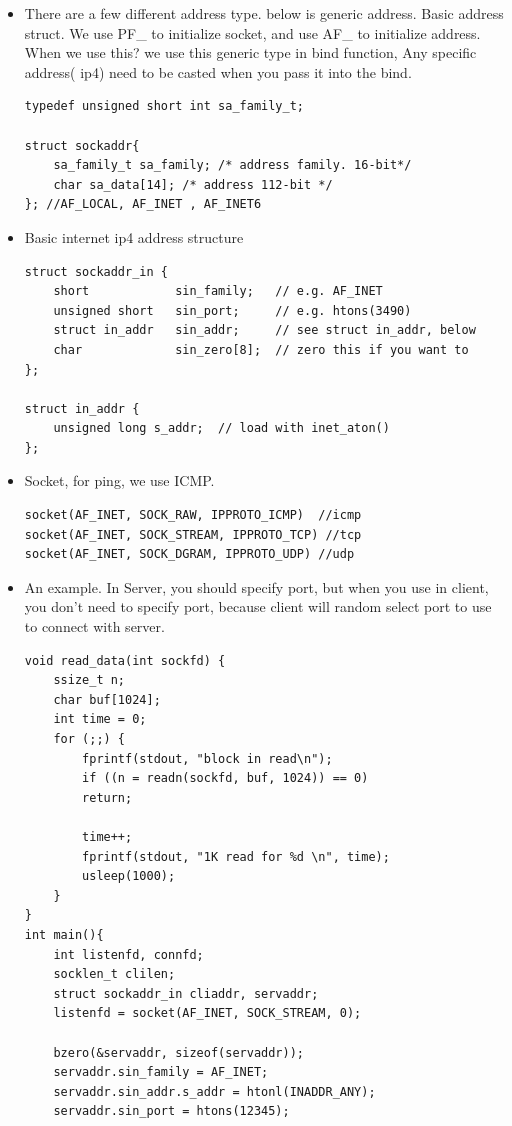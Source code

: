 \documentclass[a4paper,11pt,twoside]{book}
\begin{document}
\begin{itemize}
	\item There are a few different address type. below is generic address. Basic address struct. We use PF\_ to initialize socket, and use AF\_ to initialize  address. When we use this? we use this generic type in bind function, Any specific address( ip4) need to be casted when you pass it into the bind.  
\begin{lstlisting}
typedef unsigned short int sa_family_t;

struct sockaddr{
	sa_family_t sa_family; /* address family. 16-bit*/
	char sa_data[14]; /* address 112-bit */
}; //AF_LOCAL, AF_INET , AF_INET6	
\end{lstlisting}	
	
	\item Basic internet ip4 address structure
\begin{lstlisting}
struct sockaddr_in {
	short            sin_family;   // e.g. AF_INET
	unsigned short   sin_port;     // e.g. htons(3490)
	struct in_addr   sin_addr;     // see struct in_addr, below
	char             sin_zero[8];  // zero this if you want to
};

struct in_addr {
	unsigned long s_addr;  // load with inet_aton()
};	
\end{lstlisting}		
	

\item Socket, for ping, we use ICMP. 
\begin{lstlisting}
socket(AF_INET, SOCK_RAW, IPPROTO_ICMP)  //icmp
socket(AF_INET, SOCK_STREAM, IPPROTO_TCP) //tcp
socket(AF_INET, SOCK_DGRAM, IPPROTO_UDP) //udp	
\end{lstlisting}	

	
	\item An example. In Server, you should specify port, but when you use in client, you don't need to specify port, because client will random select port to use to connect with server. 
\begin{lstlisting}
void read_data(int sockfd) {
	ssize_t n;
	char buf[1024];	
	int time = 0;
	for (;;) {
		fprintf(stdout, "block in read\n");
		if ((n = readn(sockfd, buf, 1024)) == 0)
		return;
		
		time++;
		fprintf(stdout, "1K read for %d \n", time);
		usleep(1000);
	}
}
int main(){	
	int listenfd, connfd;
	socklen_t clilen;
	struct sockaddr_in cliaddr, servaddr;	
	listenfd = socket(AF_INET, SOCK_STREAM, 0);

	bzero(&servaddr, sizeof(servaddr));
	servaddr.sin_family = AF_INET;
	servaddr.sin_addr.s_addr = htonl(INADDR_ANY);
	servaddr.sin_port = htons(12345);
	

\end{lstlisting}
\end{itemize}
\end{document}
